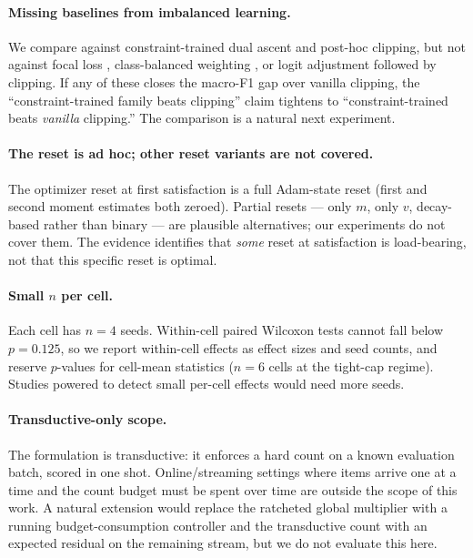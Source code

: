 \documentclass[10pt]{article}
\begin{document}
\paragraph{Missing baselines from imbalanced learning.}
We compare against constraint-trained dual ascent and post-hoc clipping,
but not against focal loss \citep{lin2017focal}, class-balanced weighting
\citep{cui2019class}, or logit adjustment \citep{menon2020long} followed
by clipping. If any of these closes the macro-F1 gap over vanilla
clipping, the ``constraint-trained family beats clipping'' claim
tightens to ``constraint-trained beats \emph{vanilla} clipping.'' The
comparison is a natural next experiment.

\paragraph{The reset is ad hoc; other reset variants are not covered.}
The optimizer reset at first satisfaction is a full Adam-state reset
(first and second moment estimates both zeroed). Partial resets --- only
$m$, only $v$, decay-based rather than binary --- are plausible
alternatives; our experiments do not cover them. The evidence identifies
that \emph{some} reset at satisfaction is load-bearing, not that this
specific reset is optimal.

\paragraph{Small $n$ per cell.}
Each cell has $n{=}4$ seeds. Within-cell paired Wilcoxon tests cannot
fall below $p{=}0.125$, so we report within-cell effects as effect sizes
and seed counts, and reserve $p$-values for cell-mean statistics ($n{=}6$
cells at the tight-cap regime). Studies powered to detect small
per-cell effects would need more seeds.

\paragraph{Transductive-only scope.}
The formulation is transductive: it enforces a hard count on a known
evaluation batch, scored in one shot. Online/streaming settings where
items arrive one at a time and the count budget must be spent over time
are outside the scope of this work. A natural extension would replace
the ratcheted global multiplier with a running budget-consumption
controller and the transductive count with an expected residual on the
remaining stream, but we do not evaluate this here.
\end{document}
